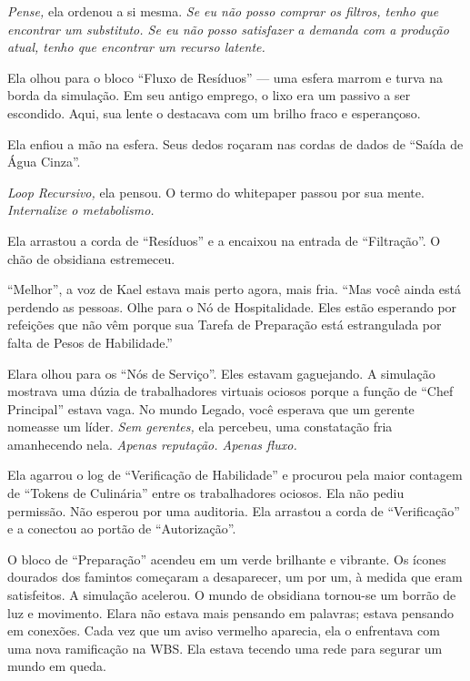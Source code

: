 \textit{Pense,} ela ordenou a si mesma. \textit{Se eu não posso comprar os filtros, tenho que encontrar um substituto. Se eu não posso satisfazer a demanda com a produção atual, tenho que encontrar um recurso latente.}

Ela olhou para o bloco ``Fluxo de Resíduos'' --- uma esfera marrom e turva na borda da simulação. Em seu antigo emprego, o lixo era um passivo a ser escondido. Aqui, sua lente o destacava com um brilho fraco e esperançoso.

Ela enfiou a mão na esfera. Seus dedos roçaram nas cordas de dados de ``Saída de Água Cinza''.

\textit{Loop Recursivo,} ela pensou. O termo do whitepaper passou por sua mente. \textit{Internalize o metabolismo.}

Ela arrastou a corda de ``Resíduos'' e a encaixou na entrada de ``Filtração''. O chão de obsidiana estremeceu.


``Melhor'', a voz de Kael estava mais perto agora, mais fria. ``Mas você ainda está perdendo as pessoas. Olhe para o Nó de Hospitalidade. Eles estão esperando por refeições que não vêm porque sua Tarefa de Preparação está estrangulada por falta de Pesos de Habilidade.''

Elara olhou para os ``Nós de Serviço''. Eles estavam gaguejando. A simulação mostrava uma dúzia de trabalhadores virtuais ociosos porque a função de ``Chef Principal'' estava vaga. No mundo Legado, você esperava que um gerente nomeasse um líder. \textit{Sem gerentes,} ela percebeu, uma constatação fria amanhecendo nela. \textit{Apenas reputação. Apenas fluxo.}

Ela agarrou o log de ``Verificação de Habilidade'' e procurou pela maior contagem de ``Tokens de Culinária'' entre os trabalhadores ociosos. Ela não pediu permissão. Não esperou por uma auditoria. Ela arrastou a corda de ``Verificação'' e a conectou ao portão de ``Autorização''.

O bloco de ``Preparação'' acendeu em um verde brilhante e vibrante. Os ícones dourados dos famintos começaram a desaparecer, um por um, à medida que eram satisfeitos. A simulação acelerou. O mundo de obsidiana tornou-se um borrão de luz e movimento. Elara não estava mais pensando em palavras; estava pensando em conexões. Cada vez que um aviso vermelho aparecia, ela o enfrentava com uma nova ramificação na WBS. Ela estava tecendo uma rede para segurar um mundo em queda.

